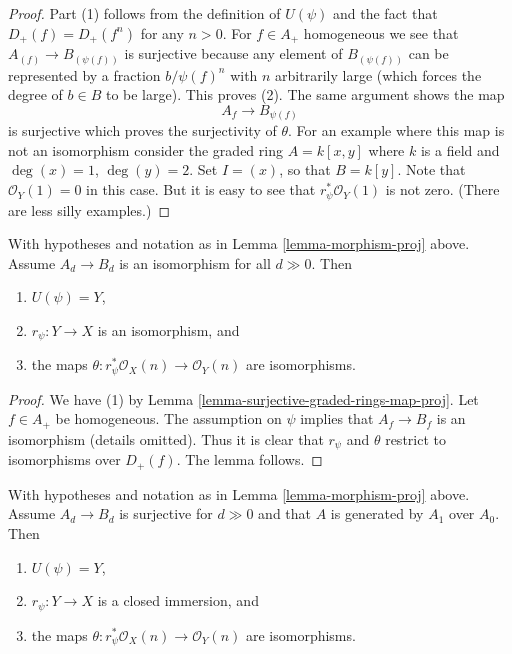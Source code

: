 \begin{proof}
Part (1) follows from the definition of $U(\psi)$ and the fact that
$D_{+}(f) = D_{+}(f^n)$ for any $n > 0$. For $f \in A_{+}$ homogeneous
we see that $A_{(f)} \to B_{(\psi(f))}$ is surjective because
any element of $B_{(\psi(f))}$ can be represented by a fraction
$b/\psi(f)^n$ with $n$ arbitrarily large (which forces the degree of
$b \in B$ to be large). This proves (2).
The same argument shows the map
$$
A_f \to B_{\psi(f)}
$$
is surjective which proves the surjectivity of $\theta$.
For an example where this map is not an isomorphism
consider the graded ring $A = k[x, y]$ where $k$ is a field
and $\deg(x) = 1$, $\deg(y) = 2$. Set $I = (x)$, so that
$B = k[y]$. Note that $\mathcal{O}_Y(1) = 0$ in this case.
But it is easy to see that $r_\psi^*\mathcal{O}_Y(1)$
is not zero. (There are less silly examples.)
\end{proof}

\begin{lemma}
\label{lemma-eventual-iso-graded-rings-map-proj}
With hypotheses and notation as in Lemma \ref{lemma-morphism-proj} above.
Assume $A_d \to B_d$ is an isomorphism for all $d \gg 0$. Then
\begin{enumerate}
\item $U(\psi) = Y$,
\item $r_\psi : Y \to X$ is an isomorphism, and
\item the maps $\theta : r_\psi^*\mathcal{O}_X(n) \to \mathcal{O}_Y(n)$
are isomorphisms.
\end{enumerate}
\end{lemma}

\begin{proof}
We have (1) by Lemma \ref{lemma-surjective-graded-rings-map-proj}.
Let $f \in A_{+}$ be homogeneous. The assumption on $\psi$ implies that
$A_f \to B_f$ is an isomorphism (details omitted). Thus it is clear that
$r_\psi$ and $\theta$ restrict to isomorphisms over $D_{+}(f)$.
The lemma follows.
\end{proof}

\begin{lemma}
\label{lemma-surjective-graded-rings-generated-degree-1-map-proj}
With hypotheses and notation as in Lemma \ref{lemma-morphism-proj} above.
Assume $A_d \to B_d$ is surjective for $d \gg 0$ and that $A$ is generated
by $A_1$ over $A_0$. Then
\begin{enumerate}
\item $U(\psi) = Y$,
\item $r_\psi : Y \to X$ is a closed immersion, and
\item the maps $\theta : r_\psi^*\mathcal{O}_X(n) \to \mathcal{O}_Y(n)$
are isomorphisms.
\end{enumerate}
\end{lemma}

